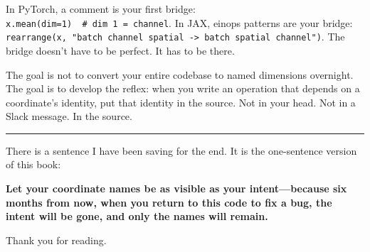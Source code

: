 \documentclass[11pt,]{article}
\begin{document}
In PyTorch, a comment is your first bridge:
\texttt{x.mean(dim=1)\ \ \#\ dim\ 1\ =\ channel}. In JAX, einops
patterns are your bridge:
\texttt{rearrange(x,\ "batch\ channel\ spatial\ -\textgreater{}\ batch\ spatial\ channel")}.
The bridge doesn't have to be perfect. It has to be there.

The goal is not to convert your entire codebase to named dimensions
overnight. The goal is to develop the reflex: when you write an
operation that depends on a coordinate's identity, put that identity in
the source. Not in your head. Not in a Slack message. In the source.

\begin{center}\rule{0.5\linewidth}{0.4pt}\end{center}

There is a sentence I have been saving for the end. It is the
one-sentence version of this book:

\textbf{Let your coordinate names be as visible as your intent---because
six months from now, when you return to this code to fix a bug, the
intent will be gone, and only the names will remain.}

Thank you for reading.

\newpage
\end{document}
